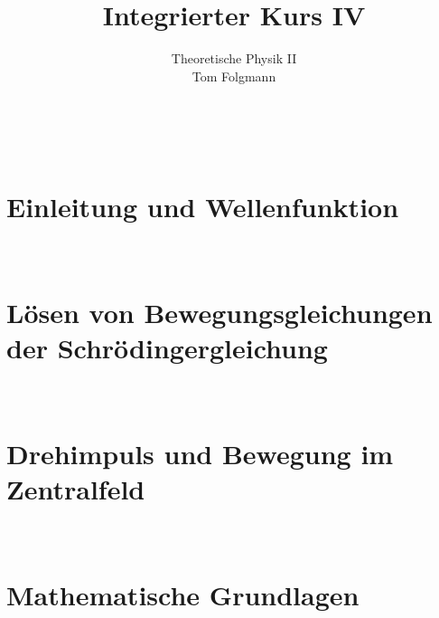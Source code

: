 \documentclass{article}
\title{Integrierter Kurs IV}
\author{Theoretische Physik II\\Tom Folgmann}
\begin{document}
    \maketitle
    \noindent{}
    \tableofcontents
    \thispagestyle{empty}
    \newpage
    \ 
    \thispagestyle{empty}
    \newpage

    \section{Einleitung und Wellenfunktion}
        
        
        
        
        
        
        
        
    
    \clearpage
    \thispagestyle{empty}
    \newpage
    \ 
    \thispagestyle{empty}
    \newpage
    \section{Lösen von Bewegungsgleichungen der Schrödingergleichung}
        
        
        
        

    \clearpage
    \thispagestyle{empty}
    \newpage
    \ 
    \thispagestyle{empty}
    \newpage
    \section{Drehimpuls und Bewegung im Zentralfeld}
        

        
        

    \clearpage
    \thispagestyle{empty}
    \newpage
    \ 
    \thispagestyle{empty}
    \newpage
    \section{Mathematische Grundlagen}
        
        
        
        
        
        
        
        
    \clearpage
    \thispagestyle{empty}
    \newpage
    \ 
    \thispagestyle{empty}
    \newpage
\end{document}

